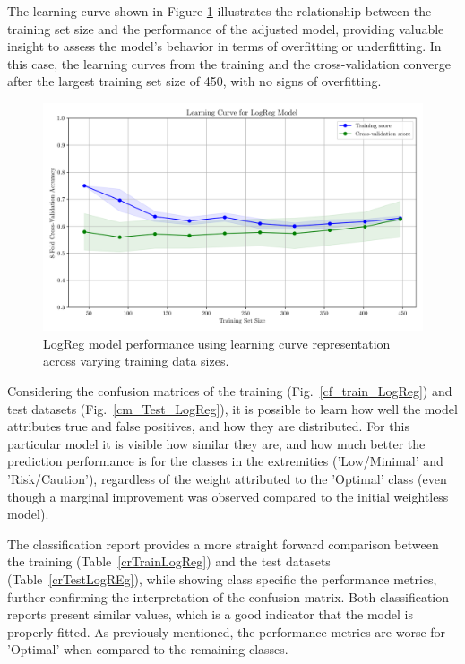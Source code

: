 \documentclass[conference]{IEEEtran}
\begin{document}
The learning curve shown in Figure \ref{lcLogReg} illustrates the relationship between the training set size and the performance of the adjusted model, providing valuable insight to assess the model's behavior in terms of overfitting or underfitting. In this case, the learning curves from the training and the cross-validation converge after the largest training set size of 450, with no signs of overfitting.

\begin{figure}[H]
    \centering
    \includegraphics[width=1\linewidth]{assets/LOGR_lercurve.png}
    \caption{LogReg model performance using learning curve representation across varying training data sizes.}
    \label{lcLogReg}
\end{figure} %

Considering the confusion matrices of the training (Fig.~\ref{cf_train_LogReg}) and test datasets (Fig.~\ref{cm_Test_LogReg}), it is possible to learn how well the model attributes true and false positives, and how they are distributed. For this particular model it is visible how similar they are, and how much better the prediction performance is for the classes in the extremities ('Low/Minimal' and 'Risk/Caution'), regardless of the weight attributed to the 'Optimal' class (even though a marginal improvement was observed compared to the initial weightless model).

The classification report provides a more straight forward comparison between the training (Table~\ref{crTrainLogReg}) and the test datasets (Table~\ref{crTestLogREg}), while showing class specific the performance metrics, further confirming the interpretation of the confusion matrix. Both classification reports present similar values, which is a good indicator that the model is properly fitted. As previously mentioned, the performance metrics are worse for 'Optimal' when compared to the remaining classes.
\end{document}
